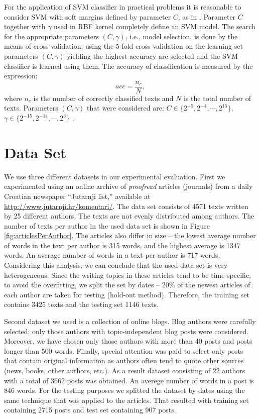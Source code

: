 \documentclass{llncs}
\begin{document}
For the application of SVM classifier in practical problems it is reasonable to
consider SVM with soft margins defined by parameter $C$, as in
\cite{cortes1995support}. Parameter $C$ together with $\gamma$ used in RBF kernel
completely define an SVM model. The search for the appropriate parameters $(C,
\gamma)$, i.e., model selection, is done by the means of cross-validation: using
the 5-fold cross-validation on the learning set parameters $(C, \gamma)$ yielding
the highest accuracy are selected and the SVM classifier is learned using them.
The accuracy of classification is measured by the expression:
\begin{equation}
acc = \frac{n_c}{N}, %
\end{equation}
where $n_c$ is the number of correctly classified texts and $N$ is the total number of
texts.
Parameters $(C, \gamma)$ that were considered are: $C \in \{2^{-5}, 2^{-4},
\cdots , 2^{15}\}$, $\gamma \in \{2^{-15}, 2^{-14}, \cdots, 2^3\}$ \cite{CC01a}.

\section{Data Set}
\label{sec:podatci}
We use three different datasets in our experimental evaluation. First we
experimented using an online archive of \emph{proofread} articles (journals) from
a daily Croatian newspaper ``Jutarnji list,'' available at
\url{http://www.jutarnji.hr/komentari/}. The data set consists of 4571 texts
written by 25 different authors. The texts are not evenly distributed among
authors. The number of texts per author in the used data set is shown in Figure
\ref{fig:articlesPerAuthor}. The articles also differ in size -- the lowest
average number of words in the text per author is 315 words, and the highest
average is 1347 words. An average number of words in a text per author is 717
words. Considering this analysis, we can conclude that the used data set is very
heterogeneous. Since the writing topics in these articles tend to be
time-specific, to avoid the overfitting, we split the set by dates -- 20\% of the
newest articles of each author are taken for testing (hold-out method).
Therefore, the training set contains 3425 texts and the testing set 1146 texts.

Second dataset we used is a collection of online blogs. Blog authors were
carefully selected: only those authors with topic-independent blog posts were
considered. Moreover, we have chosen only those authors with more than 40 posts
and posts longer than 500 words. Finally, special attention was paid to select
only posts that contain original information as authors often tend to
quote other sources (news, books, other authors, etc.). As a result dataset
consisting of 22 authors with a total of 3662 posts was obtained. An
averege number of words in a post is 846 words. For the testing purposes we
splitted the dataset by dates using the same technique that was applied to the
articles. That resulted with training set containing 2715 posts and test set
containing 907 posts.
\end{document}
